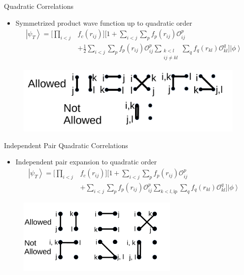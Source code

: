 \documentclass{beamer}
\newcommand{\ket}[1]{\left| #1 \right>}
\newcommand{\fpij}{f_p(r_{ij})}
\newcommand{\Opij}{\mathcal{O}_{ij}^p}
\newcommand{\fOpij}{\sum\limits_{i<j}\sum\limits_p \fpij\Opij}
\newcommand{\fqkl}{f_q(r_{kl})}
\newcommand{\Oqkl}{\mathcal{O}_{kl}^q}
\newcommand{\fOqklip}{\sum\limits_{k<l,\mathrm{ip}}\sum\limits_q \fqkl\Oqkl}
\newcommand{\fOqklquad}{\sum_{\substack{k<l\\ij \ne kl}}\sum\limits_q \fqkl\Oqkl}
\begin{document}
\begin{frame}{Quadratic Correlations}
\begin{itemize}
   \item Symmetrized product wave function up to quadratic order
   \begin{equation*}
   \begin{split}
      \ket{\psi_T} = \Bigg[\prod\limits_{i<j}&f_c(r_{ij})\Bigg] \Bigg[1+\fOpij \\
      & + \frac{1}{2}\fOpij\fOqklquad \Bigg] \ket{\phi}
   \end{split}
   \end{equation*}
\end{itemize}
\begin{figure}[h]
   \centering
   \includegraphics[width=1.0\textwidth]{pairing_fullquad.pdf}
\end{figure}
\end{frame}

\begin{frame}{Independent Pair Quadratic Correlations}
\begin{itemize}
   \item Independent pair expansion to quadratic order
   \begin{equation*}
   \begin{split}
      \ket{\psi_T} = \Bigg[\prod\limits_{i<j}&f_c(r_{ij})\Bigg] \Bigg[1+\fOpij \\
      & + \fOpij\fOqklip \Bigg] \ket{\phi}
   \end{split}
   \end{equation*}
\end{itemize}
\begin{figure}[h]
   \centering
   \includegraphics[width=0.7\textwidth]{pairing.pdf}
\end{figure}
\end{frame}
\end{document}
